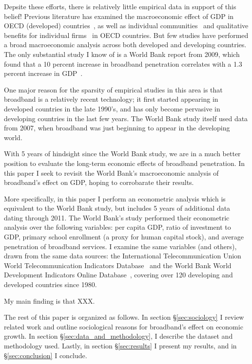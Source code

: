 Depsite these efforts, there is relatively little empirical data in support of this belief!
Previous literature has examined the macroeconomic effect of GDP in OECD
(developed) countries~\cite{koutroumpis2009economic}, as well as individual
communities~\cite{gillett2006measuring} and
qualitative benefits for individual firms~\cite{varian2002net} in OECD
countries. But few studies have performed a broad macroeconomic analysis
across both developed and developing
countries. The only substantial study I know of is a World Bank report
from 2009, which found that a 10 percent increase in broadband penetration
correlates with a 1.3 percent increase in GDP~\cite{qiang2009economic}.

One major reason for the sparsity of empirical studies in this area is that
broadband is a relatively recent technology; it first started appearing in
developed countries in the late 1990's, and has only become pervasive in
developing countries in the last few years. The World Bank study itself
used data from 2007, when broadband was just beginning to appear in
the developing world.

With 5 years of hindsight since the World Bank study, we are in a much better
position to evaluate the long-term economic effects of broadband penetration.
In this paper I seek to revisit the World Bank's macroeconomic analysis of
broadband's effect on GDP, hoping to corrobarate their results.

More specifically, in this paper I perform an econometric analysis which is
equivalent to the World Bank study, but includes 5 years of additional data
dating through 2011. The World Bank's study performed their econometric analysis
over the following variables: per capita GDP, ratio of
investment to GDP, primary school enrollment (a proxy for human capital stock),
and average penetration of broadband services. I examine the same variables (and others),
drawn from the same data sources: the International Telecommunication Union World
Telecommunication Indicators Database~\cite{itu} and the World Bank World Development Indicators Online
Database~\cite{wdi}, covering over 120 developing
and developed countries since 1980.

My main finding is that XXX.

The rest of this paper is organized as follows. In section \S\ref{sec:sociology} I review related work
 and outline sociological reasons for broadband's effect on economic growth. In section
\S\ref{sec:data_and_methodology}, I describe the dataset and methodology used. Lastly, in section
\S\ref{sec:results} I present my results, and in \S\ref{sec:conclusion} I conclude.


